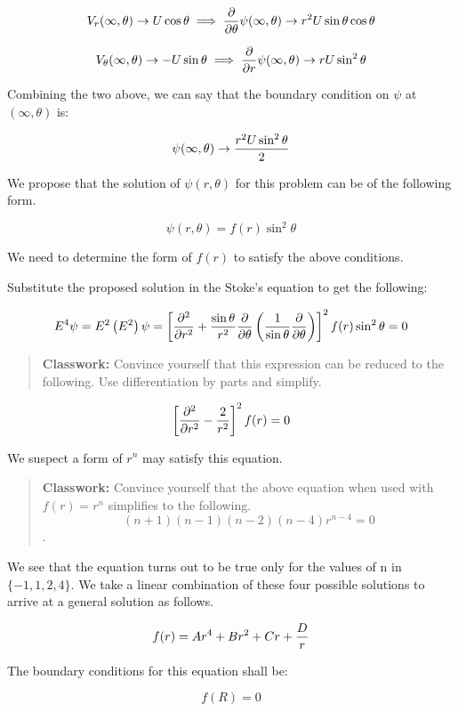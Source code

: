 $$ V_r(\infty,\theta) \rightarrow U \cos\theta \implies {\partial \over \partial \theta} \psi( \infty,\theta) \rightarrow  r^2 U \sin\theta \cos\theta$$

$$ V_\theta(\infty,\theta) \rightarrow -U \sin\theta \implies {\partial \over \partial r} \psi(\infty,\theta) \rightarrow rU\sin^2\theta$$

Combining the two above, we can say that the boundary condition on $\psi$ at $(\infty,\theta)$ is:

$$ \psi(\infty,\theta) \rightarrow {r^2 U \sin^2 \theta \over 2} $$

We propose that the solution of $\psi(r,\theta)$ for this problem can be of the following form.

$$ \psi(r,\theta) = f(r) \sin^2 \theta$$

We need to determine the form of $f(r)$ to satisfy the above conditions.

Substitute the proposed solution in the Stoke's equation to get the following:

$$ E^4 \psi = E^2 \left( E^2 \right) \psi = \left[ {\partial^2 \over \partial r^2} + {\sin \theta \over r^2} {\partial \over \partial \theta} \left( {1 \over \sin\theta} {\partial \over \partial \theta} \right) \right]^2 f(r) \sin^2 \theta = 0 $$


\begin{quote}
{\bf Classwork:} Convince yourself that this expression can be reduced to the following. Use differentiation by parts and simplify.
\end{quote}


$$ \left[ {\partial^2 \over \partial r^2} - {2 \over r^2} \right]^2 f(r) = 0 $$


We suspect a form of $r^n$ may satisfy this equation. 

\begin{quote}
{\bf Classwork:} Convince yourself that the above equation when used with $f(r)=r^n$ simplifies to the following. 
$$(n+1)(n-1)(n-2)(n-4)r^{n-4}=0$$.
\end{quote}


We see that the equation turns out to be true only for the values of n in $\{-1, 1, 2, 4 \}$. We take a linear combination of these four possible solutions to arrive at a general solution as follows.

$$ f(r) = A r^4 + B r^2 + Cr + {D \over r}$$

The boundary conditions for this equation shall be:

$$ f\left(R\right) = 0 $$

